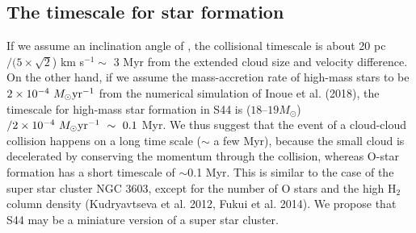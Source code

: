 \documentclass[onecolumn]{pasj01}
\begin{document}
{{{{{{\subsection{{The timescale {for} star formation}}
If we assume {an} inclination angle {of , the collisional timescale is about 20 pc$/ (5 \times \sqrt{2}$) km s$^{-1} \sim$ 3 Myr} from the extended cloud size and velocity difference.
On the other hand, if we {assume} the mass-accretion rate of high-mass stars {to be} $2\times10^{-4}\ M_{\odot}{\rm yr}^{-1}$ from the numerical simulation of Inoue et al. (2018), the timescale {for} {high-mass} {star} formation {in} S44 is {($18$--$19 M_{\odot}$)}$/2\times10^{-4}\ M_{\odot}{\rm yr}^{-1}\ \sim\ 0.1$ Myr.
We {thus} suggest that the event of a cloud-cloud collision happen{s on} a long time scale ($\sim$ a few Myr), because the small cloud is decelerate{d} {by conserving the momentum through the collision}, whereas {O-star} formation {has} a {short} timescale {of} $\sim$0.1 Myr.
This is similar to the case of the super {star} cluster NGC 3603, except for the number of O stars and {the} high {H$_2$} column density (Kudryavtseva et al. 2012, Fukui et al. 2014). We propose that S44 {may} be a miniature {version} of {a} super star cluster.






}}}}}}
\end{document}
